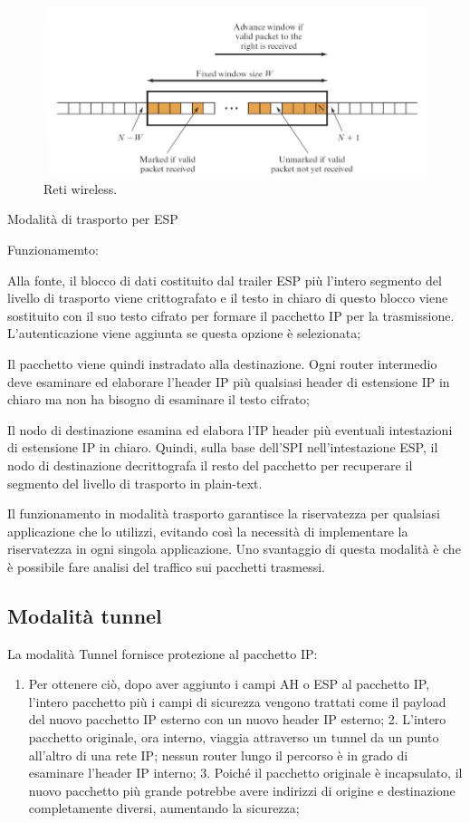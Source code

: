 \begin{figure}[h]
    \centering
    \includegraphics[width=1\textwidth]{images/chapter9/9-10.png}
    \caption{Reti wireless.}
    \label{fig:9-10}
\end{figure}

Modalità di trasporto per ESP

Funzionamemto:
	\item Alla fonte, il blocco di dati costituito dal trailer ESP più l'intero segmento del livello di trasporto viene crittografato e il testo in chiaro di questo blocco viene sostituito con il suo testo cifrato per formare il pacchetto IP per la trasmissione. L'autenticazione viene aggiunta se questa opzione è selezionata;
	\item Il pacchetto viene quindi instradato alla destinazione. Ogni router intermedio deve esaminare ed elaborare l'header IP più qualsiasi header di estensione IP in chiaro ma non ha bisogno di esaminare il testo cifrato;
	\item Il nodo di destinazione esamina ed elabora l'IP header più eventuali intestazioni di estensione IP in chiaro. Quindi, sulla base dell'SPI nell'intestazione ESP, il nodo di destinazione decrittografa il resto del pacchetto per recuperare il segmento del livello di trasporto in plain-text.
	
Il funzionamento in modalità trasporto garantisce la riservatezza per qualsiasi applicazione che lo utilizzi, evitando così la necessità di implementare la riservatezza in ogni singola applicazione. Uno svantaggio di questa modalità è che è possibile fare analisi del traffico  sui pacchetti trasmessi.

\subsection{Modalità tunnel}

La modalità Tunnel fornisce protezione al pacchetto IP:
\begin{enumerate}
    \item Per ottenere ciò, dopo aver aggiunto i campi AH o ESP al pacchetto IP, l'intero pacchetto più i campi di sicurezza vengono trattati come il payload del nuovo pacchetto IP esterno con un nuovo header IP esterno;
	2. L'intero pacchetto originale, ora interno, viaggia attraverso un tunnel da un punto all'altro di una rete IP; nessun router lungo il percorso è in grado di esaminare l'header IP interno;
	3. Poiché il pacchetto originale è incapsulato, il nuovo pacchetto più grande potrebbe avere indirizzi di origine e destinazione completamente diversi, aumentando la sicurezza;
\end{enumerate}

